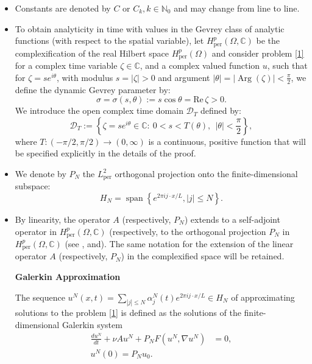 \documentclass[12pt]{article}
\theoremstyle{plain}
\theoremstyle{remark}
\newcommand{\Hper}{H_{\mathrm{per}}}
\begin{document}
\begin{itemize}
\item Constants are denoted  by $C$ or $C_k, k\in \mathbb{N}_0$ and may change from line to line.

\item To obtain analyticity in time with values in the Gevrey class of analytic functions (with respect to the spatial variable), let  $\Hper ^p (\Omega,\mathbb{C})$ be the complexification of the real Hilbert space $\Hper ^p (\Omega)$ and consider problem \eqref{1} for a complex time variable $\zeta \in \mathbb{C}$, and a complex valued function $u$, such that for
 $\zeta = s e^{i\theta}$, with modulus $s = |\zeta| > 0$ and argument $|\theta| = |\operatorname{Arg} (\zeta)| < \frac{\pi}{2}$, we define the dynamic Gevrey parameter by:
\[
\sigma = \sigma(s,\theta) := s\cos\theta = \mathrm{Re}\,\zeta >0.
\]
We introduce the open complex time domain $\mathcal{D}_T$ defined by:
\[
\mathcal{D}_T := \left\{\zeta = s e^{i\theta} \in \mathbb{C} :\ 0 < s < T(\theta), \ \ |\theta| < \frac{\pi}{2}\right\},
\]
where $T: (-\pi/2, \pi/2) \to (0,\infty)$ is a continuous, positive function that will be specified explicitly in the details of the proof.

\item We denote by $P_N$ the $L_\text{per}^2$ orthogonal projection onto the finite-dimensional subspace:
\[
H_N = \operatorname{span} \left\{ e^{2\pi i j \cdot x /L} ,  |j| \leq N \right\}.
\]
\item By linearity, the operator $A$ (respectively, $P_N $) extends to a self-adjoint operator in $\Hper^p(\Omega,\mathbb{C})$ (respectively, to the orthogonal projection $P_N $ in $\Hper ^p (\Omega,\mathbb{C})$  (see \cite{BuehlerSalamon2017}, \cite{moslehian2022similarities} and\cite{Sabourova2007}). The same notation for the extension of the linear operator $A$ (respectively, $P_N$) in the complexified space will be retained.

\vspace{0.5cm}
\noindent \textbf{Galerkin Approximation}

 
The sequence $u^N(x, t) = \sum_{ |j| \leq N} \alpha_j^N(t)  e^{2\pi i j \cdot x / L}\in H_N$  of approximating solutions to the problem \eqref{1} is defined as the solutions  of the finite-dimensional Galerkin system
\begin{align*}
    \frac{du^N}{dt} + \nu A u^N + P_N F(u^N,\nabla u^N) &= 0,\\
    u^N(0)= P_N u_0 .
\end{align*}
\end{itemize}
\end{document}
